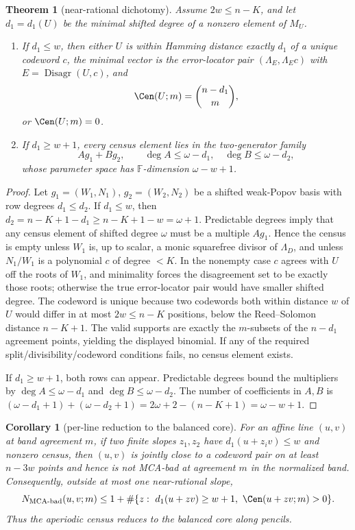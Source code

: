 \documentclass[11pt]{article}
\newtheorem{theorem}{Theorem}[section]
\newtheorem{corollary}[corollary]{Corollary}
\theoremstyle{definition}
\theoremstyle{remark}
\newcommand{\F}{\mathbb{F}}
\begin{document}
\begin{theorem}[near-rational dichotomy]\label{thm:capfr1-near-rational-dichotomy}
Assume \(2w\le n-K\), and let \(d_1=d_1(U)\) be the minimal shifted degree of a nonzero element of \(M_U\).
\begin{enumerate}[label=\textup{(\roman*)}]
\item If \(d_1\le w\), then either \(U\) is within Hamming distance exactly \(d_1\) of a unique codeword \(c\), the minimal vector is the error-locator pair \((\Lambda_E,\Lambda_Ec)\) with \(E=\operatorname{Disagr}(U,c)\), and
\[
        \Cen(U;m)=\binom{n-d_1}{m},
\]
or \(\Cen(U;m)=0\).
\item If \(d_1\ge w+1\), every census element lies in the two-generator family
\[
        Ag_1+Bg_2,
        \qquad
        \deg A\le \omega-d_1,\quad \deg B\le \omega-d_2,
\]
whose parameter space has \(\F\)-dimension \(\omega-w+1\).
\end{enumerate}
\end{theorem}

\begin{proof}
Let \(g_1=(W_1,N_1)\), \(g_2=(W_2,N_2)\) be a shifted weak-Popov basis with row degrees \(d_1\le d_2\).  If \(d_1\le w\), then \(d_2=n-K+1-d_1\ge n-K+1-w=\omega+1\).  Predictable degrees imply that any census element of shifted degree \(\omega\) must be a multiple \(Ag_1\).  Hence the census is empty unless \(W_1\) is, up to scalar, a monic squarefree divisor of \(\Lambda_D\), and unless \(N_1/W_1\) is a polynomial \(c\) of degree \(<K\).  In the nonempty case \(c\) agrees with \(U\) off the roots of \(W_1\), and minimality forces the disagreement set to be exactly those roots; otherwise the true error-locator pair would have smaller shifted degree.  The codeword is unique because two codewords both within distance \(w\) of \(U\) would differ in at most \(2w\le n-K\) positions, below the Reed--Solomon distance \(n-K+1\).  The valid supports are exactly the \(m\)-subsets of the \(n-d_1\) agreement points, yielding the displayed binomial.  If any of the required split/divisibility/codeword conditions fails, no census element exists.

If \(d_1\ge w+1\), both rows can appear.  Predictable degrees bound the multipliers by \(\deg A\le\omega-d_1\) and \(\deg B\le\omega-d_2\).  The number of coefficients in \(A,B\) is \((\omega-d_1+1)+(\omega-d_2+1)=2\omega+2-(n-K+1)=\omega-w+1\).
\end{proof}

\begin{corollary}[per-line reduction to the balanced core]\label{cor:capfr1-balanced-line}
For an affine line \((u,v)\) at band agreement \(m\), if two finite slopes \(z_1,z_2\) have \(d_1(u+z_iv)\le w\) and nonzero census, then \((u,v)\) is jointly close to a codeword pair on at least \(n-3w\) points and hence is not MCA-bad at agreement \(m\) in the normalized band.  Consequently, outside at most one near-rational slope,
\[
        N_{\mathrm{MCA\text{-}bad}}(u,v;m)
        \le
        1+
        \#\{z:\ d_1(u+zv)\ge w+1,\ \Cen(u+zv;m)>0\}.
\]
Thus the aperiodic census reduces to the balanced core along pencils.
\end{corollary}
\end{document}
